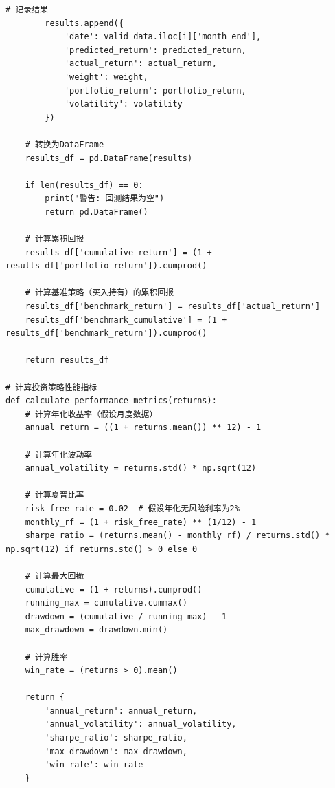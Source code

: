 \documentclass[12pt, a4paper]{article}
\begin{document}
\begin{lstlisting}[basicstyle=\small\ttfamily, breaklines=true, columns=fullflexible]
        # 记录结果
        results.append({
            'date': valid_data.iloc[i]['month_end'],
            'predicted_return': predicted_return,
            'actual_return': actual_return,
            'weight': weight,
            'portfolio_return': portfolio_return,
            'volatility': volatility
        })
    
    # 转换为DataFrame
    results_df = pd.DataFrame(results)
    
    if len(results_df) == 0:
        print("警告: 回测结果为空")
        return pd.DataFrame()
        
    # 计算累积回报
    results_df['cumulative_return'] = (1 + results_df['portfolio_return']).cumprod()
    
    # 计算基准策略（买入持有）的累积回报
    results_df['benchmark_return'] = results_df['actual_return']
    results_df['benchmark_cumulative'] = (1 + results_df['benchmark_return']).cumprod()
    
    return results_df

# 计算投资策略性能指标
def calculate_performance_metrics(returns):
    # 计算年化收益率（假设月度数据）
    annual_return = ((1 + returns.mean()) ** 12) - 1
    
    # 计算年化波动率
    annual_volatility = returns.std() * np.sqrt(12)
    
    # 计算夏普比率
    risk_free_rate = 0.02  # 假设年化无风险利率为2%
    monthly_rf = (1 + risk_free_rate) ** (1/12) - 1
    sharpe_ratio = (returns.mean() - monthly_rf) / returns.std() * np.sqrt(12) if returns.std() > 0 else 0
    
    # 计算最大回撤
    cumulative = (1 + returns).cumprod()
    running_max = cumulative.cummax()
    drawdown = (cumulative / running_max) - 1
    max_drawdown = drawdown.min()
    
    # 计算胜率
    win_rate = (returns > 0).mean()
    
    return {
        'annual_return': annual_return,
        'annual_volatility': annual_volatility,
        'sharpe_ratio': sharpe_ratio,
        'max_drawdown': max_drawdown,
        'win_rate': win_rate
    }
\end{lstlisting}
\end{document}
